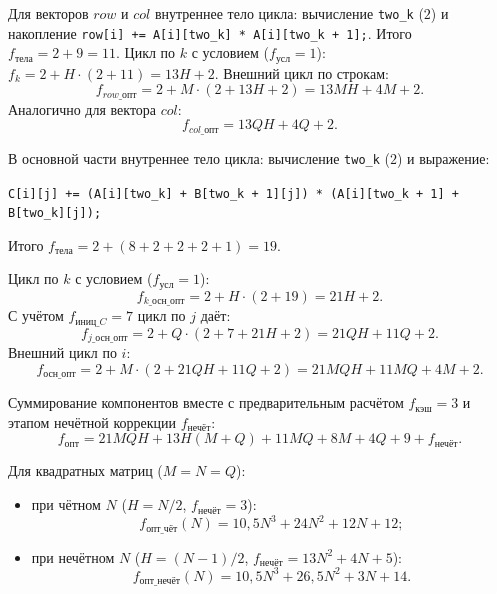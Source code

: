 Для векторов $row$ и $col$ внутреннее тело цикла: вычисление \texttt{two\_k} ($2$) и накопление \texttt{row[i] += A[i][two\_k] * A[i][two\_k + 1];}. Итого $f_{\text{тела}} = 2 + 9 = 11$.
Цикл по $k$ с условием ($f_{\text{усл}} = 1$): $f_k = 2 + H \cdot (2 + 11) = 13H + 2$.
Внешний цикл по строкам:
\begin{equation}
    f_{row\_\text{опт}} = 2 + M \cdot (2 + 13H + 2) = 13MH + 4M + 2.
\end{equation}
Аналогично для вектора $col$:
\begin{equation}
    f_{col\_\text{опт}} = 13QH + 4Q + 2.
\end{equation}

В основной части внутреннее тело цикла: вычисление \texttt{two\_k} ($2$) и выражение:
\begin{center}
\texttt{C[i][j] += (A[i][two\_k] + B[two\_k + 1][j]) * (A[i][two\_k + 1] + B[two\_k][j]);}
\end{center}
Итого $f_{\text{тела}} = 2 + (8 + 2 + 2 + 2 + 1) = 19$.

Цикл по $k$ с условием ($f_{\text{усл}} = 1$):
\begin{equation}
    f_{k\_\text{осн\_опт}} = 2 + H \cdot (2 + 19) = 21H + 2.
\end{equation}
С учётом $f_{\text{иниц\_}C} = 7$ цикл по $j$ даёт:
\begin{equation}
    f_{j\_\text{осн\_опт}} = 2 + Q \cdot (2 + 7 + 21H + 2) = 21QH + 11Q + 2.
\end{equation}
Внешний цикл по $i$:
\begin{equation}
    f_{\text{осн\_опт}} = 2 + M \cdot (2 + 21QH + 11Q + 2) = 21MQH + 11MQ + 4M + 2.
\end{equation}

Суммирование компонентов вместе с предварительным расчётом $f_{\text{кэш}} = 3$ и этапом нечётной коррекции $f_{\text{нечёт}}$:
\begin{equation}
    f_{\text{опт}} = 21MQH + 13H(M + Q) + 11MQ + 8M + 4Q + 9 + f_{\text{нечёт}}.
\end{equation}

Для квадратных матриц ($M = N = Q$):
\begin{itemize}
    \item при чётном $N$ ($H = N / 2$, $f_{\text{нечёт}} = 3$):
    \begin{equation}
        f_{\text{опт\_чёт}}(N) = 10{,}5N^3 + 24N^2 + 12N + 12;
    \end{equation}
    \item при нечётном $N$ ($H = (N - 1) / 2$, $f_{\text{нечёт}} = 13N^2 + 4N + 5$):
    \begin{equation}
        f_{\text{опт\_нечёт}}(N) = 10{,}5N^3 + 26{,}5N^2 + 3N + 14.
    \end{equation}
\end{itemize}

